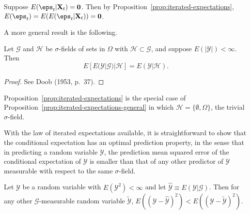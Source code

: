 \begin{example}\label{ex:iterated-expectations}
Suppose $E(\eps_t | \mathbf{X}_t) = \mathbf{0}$. Then by Proposition~\ref{prop:iterated-expectations}, $E(\eps_t) = E(E(\eps_t | \mathbf{X}_t)) = \mathbf{0}$.
\end{example}

A more general result is the following.

\begin{proposition}\label{prop:iterated-expectations-general}
Let $\mathcal{G}$ and $\mathcal{H}$ be $\sigma$-fields of sets in $\Omega$ with $\mathcal{H} \subset \mathcal{G}$, and suppose $E(|\mathcal{Y}|) < \infty$. Then
\[
E[E(\mathcal{Y}|\mathcal{G})|\mathcal{H}] = E(\mathcal{Y}|\mathcal{H}).
\]
\end{proposition}

\begin{proof}
See Doob (1953, p.~37). \qedhere
\end{proof}

Proposition~\ref{prop:iterated-expectations} is the special case of Proposition~\ref{prop:iterated-expectations-general} in which $\mathcal{H} = \{\emptyset, \Omega\}$, the trivial $\sigma$-field.

With the law of iterated expectations available, it is straightforward to show that the conditional expectation has an optimal prediction property, in the sense that in predicting a random variable $\mathcal{Y}$, the prediction mean squared error of the conditional expectation of $\mathcal{Y}$ is smaller than that of any other predictor of $\mathcal{Y}$ measurable with respect to the same $\sigma$-field.

\begin{theorem}\label{thm:optimal-prediction}
Let $\mathcal{Y}$ be a random variable with $E(\mathcal{Y}^2) < \infty$ and let $\hat{\mathcal{Y}} \equiv E(\mathcal{Y}|\mathcal{G})$. Then for any other $\mathcal{G}$-measurable random variable $\tilde{\mathcal{Y}}$, $E((\mathcal{Y} - \hat{\mathcal{Y}})^2) < E((\mathcal{Y} - \tilde{\mathcal{Y}})^2)$.
\end{theorem}

